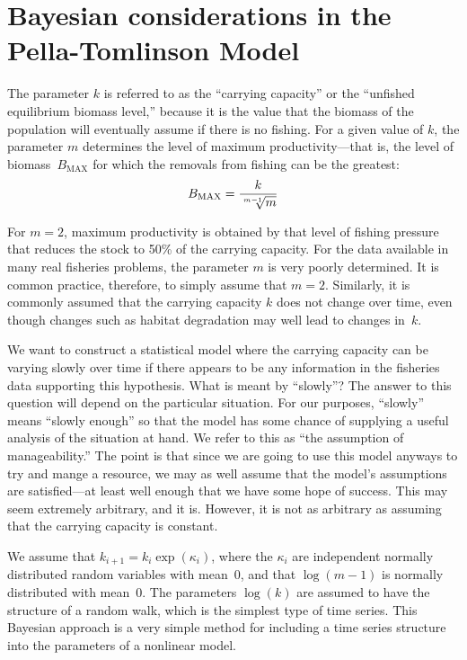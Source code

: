 \documentclass{admbmanual}
\newcommand\bmax{B_{\textrm{MAX}}}
\begin{document}
\section{Bayesian considerations in the Pella-Tomlinson Model}

The parameter $k$ is referred to as the ``carrying capacity'' or
the ``unfished equilibrium biomass level,'' because it is the value
that the biomass of the population will eventually assume if there is no
fishing.  For a given value of $k$, the parameter $m$ determines
the level of maximum productivity---that is, the level of biomass~$\bmax$
for which the removals from fishing can be the greatest:
$$\bmax=\frac{k}{\root {m-1} \of m}$$

For $m=2$, maximum productivity is obtained by that level of fishing 
pressure that reduces the stock to 50\% of the carrying capacity. 
For the data available in many real fisheries problems, the parameter
$m$ is very poorly determined. It is common practice, therefore, to
simply assume that $m=2$. Similarly, it is commonly assumed that
the carrying capacity $k$ does not change over time, even though 
changes such as habitat degradation may well lead to changes 
in~$k$. 

We want to construct a statistical model where the carrying capacity 
can be varying slowly over time if there appears to be any information
in the fisheries data supporting this hypothesis. What is meant by ``slowly''?
The answer to this question will depend on the particular situation.
For our purposes, ``slowly'' means ``slowly enough'' so that the model
has some chance of supplying a useful analysis of the situation
at hand. We refer to this as ``the assumption of manageability.''
The point is that since we are going to use this model anyways to try and
mange a resource, we may as well assume that the model's
assumptions are satisfied---at least well enough that we have some
hope of success. 
This may seem extremely arbitrary, and it is. However, it is not
as arbitrary as assuming that the carrying capacity is constant. 

We assume that $k_{i+1}=k_i \exp(\kappa_i)$, where the $\kappa_i$
are independent normally distributed random variables with mean~0,
and that $\log(m-1)$ is normally distributed with mean~0.
The parameters $\log(k)$  are assumed to have the structure of a random walk,
which is the simplest type of time series. This Bayesian approach
is a very simple method for including a time series structure into
the parameters of a nonlinear model.
\end{document}
